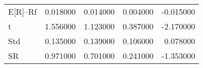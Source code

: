 \begin{tabular}{lrrrr}
\toprule
\midrule
E[R]--Rf & 0.018000 & 0.014000 & 0.004000 & -0.015000 \\
t & 1.556000 & 1.123000 & 0.387000 & -2.170000 \\
Std & 0.135000 & 0.139000 & 0.106000 & 0.078000 \\
SR & 0.971000 & 0.701000 & 0.241000 & -1.353000 \\
\bottomrule
\end{tabular}
